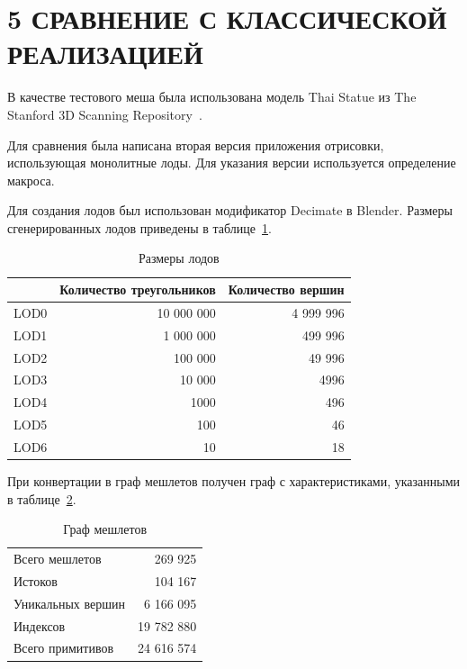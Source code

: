 \clearpage
\section{5 СРАВНЕНИЕ С КЛАССИЧЕСКОЙ РЕАЛИЗАЦИЕЙ}
В качестве тестового меша была использована модель Thai Statue из The Stanford 3D Scanning Repository~\cite{StanfordRepo}.

Для сравнения была написана вторая версия приложения отрисовки, использующая монолитные лоды.
Для указания версии используется определение макроса.

Для создания лодов был использован модификатор Decimate в Blender.
Размеры сгенерированных лодов приведены в таблице~\ref{tab:lod-sizes}.

\begin{table}[h]
    \centering

    \begin{tabular}{lrr}
        \hline \hline
        & Количество треугольников
        & Количество вершин \\ \hline
        LOD0 & 10 000 000 & 4 999 996 \\
        LOD1 &  1 000 000 &   499 996 \\
        LOD2 &    100 000 &    49 996 \\
        LOD3 &     10 000 &      4996 \\
        LOD4 &       1000 &       496 \\
        LOD5 &        100 &        46 \\
        LOD6 &         10 &        18 \\
        \hline \hline
    \end{tabular}

    \caption{Размеры лодов}
    \label{tab:lod-sizes}
\end{table}

При конвертации в граф мешлетов получен граф с характеристиками, указанными в таблице~\ref{tab:graph-sizes}.

\begin{table}[h]
    \centering

    \begin{tabular}{lr}
        \hline \hline
        Всего мешлетов    &    269 925 \\
        Истоков           &    104 167 \\
        Уникальных вершин &  6 166 095 \\
        Индексов          & 19 782 880 \\
        Всего примитивов  & 24 616 574 \\
        \hline \hline
    \end{tabular}

    \caption{Граф мешлетов}
    \label{tab:graph-sizes}
\end{table}

